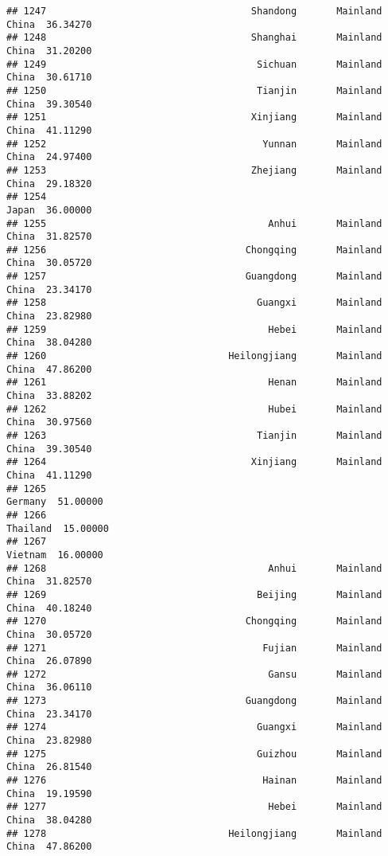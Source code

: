 \documentclass[
]{article}
\begin{document}
\begin{verbatim}
## 1247                                    Shandong       Mainland China  36.34270
## 1248                                    Shanghai       Mainland China  31.20200
## 1249                                     Sichuan       Mainland China  30.61710
## 1250                                     Tianjin       Mainland China  39.30540
## 1251                                    Xinjiang       Mainland China  41.11290
## 1252                                      Yunnan       Mainland China  24.97400
## 1253                                    Zhejiang       Mainland China  29.18320
## 1254                                                            Japan  36.00000
## 1255                                       Anhui       Mainland China  31.82570
## 1256                                   Chongqing       Mainland China  30.05720
## 1257                                   Guangdong       Mainland China  23.34170
## 1258                                     Guangxi       Mainland China  23.82980
## 1259                                       Hebei       Mainland China  38.04280
## 1260                                Heilongjiang       Mainland China  47.86200
## 1261                                       Henan       Mainland China  33.88202
## 1262                                       Hubei       Mainland China  30.97560
## 1263                                     Tianjin       Mainland China  39.30540
## 1264                                    Xinjiang       Mainland China  41.11290
## 1265                                                          Germany  51.00000
## 1266                                                         Thailand  15.00000
## 1267                                                          Vietnam  16.00000
## 1268                                       Anhui       Mainland China  31.82570
## 1269                                     Beijing       Mainland China  40.18240
## 1270                                   Chongqing       Mainland China  30.05720
## 1271                                      Fujian       Mainland China  26.07890
## 1272                                       Gansu       Mainland China  36.06110
## 1273                                   Guangdong       Mainland China  23.34170
## 1274                                     Guangxi       Mainland China  23.82980
## 1275                                     Guizhou       Mainland China  26.81540
## 1276                                      Hainan       Mainland China  19.19590
## 1277                                       Hebei       Mainland China  38.04280
## 1278                                Heilongjiang       Mainland China  47.86200

\end{verbatim}
\end{document}
